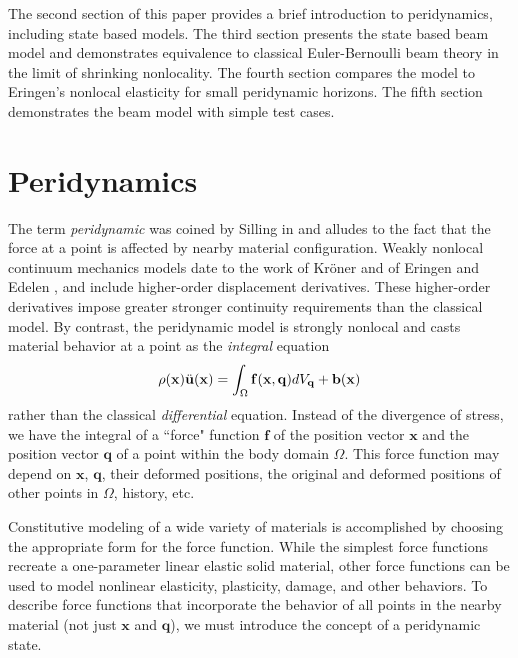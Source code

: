 \documentclass[11pt]{amsart}
\newcommand{\mathbi}[1]{\mathit{\mathbf{#1}}}
\begin{document}
The second section of this paper provides a brief introduction to peridynamics, including state based models.
The third section presents the state based beam model and demonstrates equivalence to classical Euler-Bernoulli beam theory in the limit of shrinking nonlocality.
The fourth section compares the model to Eringen's nonlocal elasticity for small peridynamic horizons.
The fifth section demonstrates the beam model with simple test cases.
%
\section{Peridynamics}
\label{sec:PDintro}
The term \textit{peridynamic} was coined by Silling in \cite{silling2000reformulation} and alludes to the fact that the force at a point is affected by nearby material configuration.
Weakly nonlocal continuum mechanics models date to the work of Kr\"oner \cite{kroner1967elasticity} and of Eringen and Edelen \cite{eringen1972nonlocal}, and include higher-order displacement derivatives.
These higher-order derivatives impose greater stronger continuity requirements than the classical model. 
By contrast, the peridynamic model is strongly nonlocal and casts material behavior at a point as the \textit{integral} equation 
%
\begin{equation}
\label{eq:PDCoPV}
\rho(\mathbf{x})\ddot{\mathbf{u}}(\mathbf{x}) = \int_\Omega \mathbi{f}(\mathbf{x},\mathbf{q}) dV_\mathbf{q}  + \mathbf{b}(\mathbf{x}) \notag
\end{equation}
%
rather than the classical \textit{differential} equation.
Instead of the divergence of stress, we have the integral of a ``force" function $\mathbi{f}$ of the position vector $\mathbf{x}$ and the position vector $\mathbf{q}$ of a point within the body domain $\Omega$. 
This force function may depend on \(\mathbf{x}\), \(\mathbf{q}\), their deformed positions, the original and deformed positions of other points in \(\Omega\), history, etc.

Constitutive modeling of a wide variety of materials is accomplished by choosing the appropriate form for the force function.
While the simplest force functions recreate a one-parameter linear elastic solid material\cite{silling2000reformulation}, other force functions can be used to model nonlinear elasticity, plasticity, damage, and other behaviors\cite{silling2005peridynamic}.
To describe force functions that incorporate the behavior of all points in the nearby material (not just \(\mathbf{x}\) and \(\mathbf{q}\)), we must introduce the concept of a peridynamic state.
\end{document}
